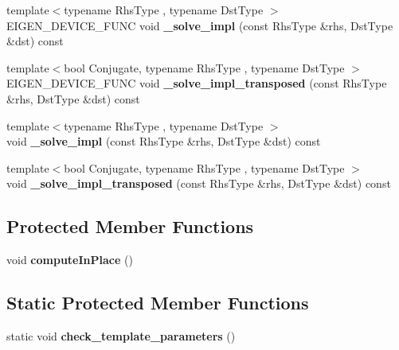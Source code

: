 \begin{DoxyCompactItemize}
{\footnotesize template$<$typename Rhs\+Type , typename Dst\+Type $>$ }\\E\+I\+G\+E\+N\+\_\+\+D\+E\+V\+I\+C\+E\+\_\+\+F\+U\+NC void {\bfseries \+\_\+solve\+\_\+impl} (const Rhs\+Type \&rhs, Dst\+Type \&dst) const
\item 
\mbox{\label{class_eigen_1_1_full_piv_l_u_a42cfd4d27becb5b0a4f2ccd007dd4fb3}} 
{\footnotesize template$<$bool Conjugate, typename Rhs\+Type , typename Dst\+Type $>$ }\\E\+I\+G\+E\+N\+\_\+\+D\+E\+V\+I\+C\+E\+\_\+\+F\+U\+NC void {\bfseries \+\_\+solve\+\_\+impl\+\_\+transposed} (const Rhs\+Type \&rhs, Dst\+Type \&dst) const
\item 
\mbox{\label{class_eigen_1_1_full_piv_l_u_af67fb62666f74a2e65cb02456918d913}} 
{\footnotesize template$<$typename Rhs\+Type , typename Dst\+Type $>$ }\\void {\bfseries \+\_\+solve\+\_\+impl} (const Rhs\+Type \&rhs, Dst\+Type \&dst) const
\item 
\mbox{\label{class_eigen_1_1_full_piv_l_u_ab1fcd233b1e1ca3fbce6f56c615ab0b6}} 
{\footnotesize template$<$bool Conjugate, typename Rhs\+Type , typename Dst\+Type $>$ }\\void {\bfseries \+\_\+solve\+\_\+impl\+\_\+transposed} (const Rhs\+Type \&rhs, Dst\+Type \&dst) const
\end{DoxyCompactItemize}
\subsection*{Protected Member Functions}
\begin{DoxyCompactItemize}
\item 
\mbox{\label{class_eigen_1_1_full_piv_l_u_ae2ef37e62e6f776e1958d6a7591863c2}} 
void {\bfseries compute\+In\+Place} ()
\end{DoxyCompactItemize}
\subsection*{Static Protected Member Functions}
\begin{DoxyCompactItemize}
\item 
\mbox{\label{class_eigen_1_1_full_piv_l_u_a6b17f29cc130870193a75f146bec0e33}} 
static void {\bfseries check\+\_\+template\+\_\+parameters} ()
\end{DoxyCompactItemize}
